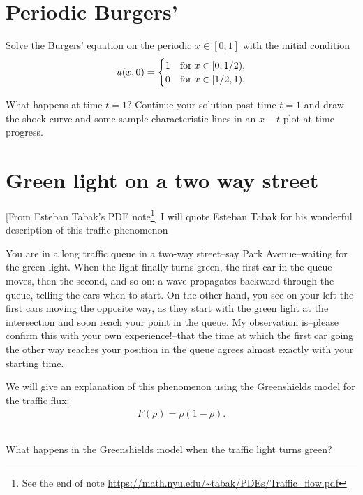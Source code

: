 \documentclass[11pt,letterpaper]{report}
\begin{document}
\section{Periodic Burgers'}
Solve the Burgers' equation on the periodic $x\in[0,1]$ with the initial condition
\begin{align}
    u(x,0) = \begin{cases}
        1 & \text{for\;} x\in[0,1/2),\\
        0 & \text{for\;} x\in[1/2,1).
    \end{cases}
\end{align}

What happens at time $t=1$? Continue your solution past time $t=1$ and draw the shock curve and some sample characteristic lines in an $x-t$ plot at time progress. 

\section{Green light on a two way street}
[From Esteban Tabak's PDE note\footnote{See the end of note \url{https://math.nyu.edu/~tabak/PDEs/Traffic_flow.pdf}}] I will quote Esteban Tabak for his wonderful description of this traffic phenomenon
\begin{displayquote}
    You are in a long traffic queue in a two-way street--say Park Avenue--waiting for the green light. When the light finally turns green, the first car in the queue moves, then the second, and so on: a wave propagates backward through the queue, telling the cars when to start. On the other hand, you see on your left the first cars moving the opposite way, as they start with the green light at the intersection and soon reach your point in the queue. My observation is--please confirm this with your own experience!--that the time at which the first car going the other way reaches your position in the queue agrees almost exactly with your starting time. 
\end{displayquote}
We will give an explanation of this phenomenon using the Greenshields model for the traffic flux:
\begin{align}
    F(\rho) = \rho(1-\rho).
\end{align}

\subsection{}
What happens in the Greenshields model when the traffic light turns green?
\end{document}
